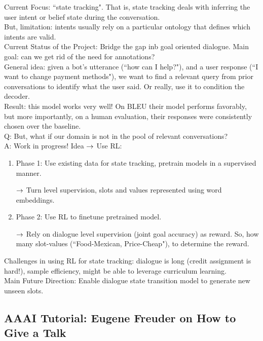 Current Focus: ``state tracking". That is, state tracking deals with inferring the user intent or belief state during the conversation. \\

But, limitation: intents usually rely on a particular ontology that defines which intents are valid. \\

Current Status of the Project: Bridge the gap inb goal oriented dialogue. Main goal: can we get rid of the need for annotations? \\

General idea: given a bot's utterance (``how can I help?"), and a user response (``I want to change payment methods"), we want to find a relevant query from prior conversations to identify what the user said. Or really, use it to condition the decoder. \\

Result: this model works very well! On BLEU their model performs favorably, but more importantly, on a human evaluation, their responses were consistently chosen over the baseline. \\

Q: But, what if our domain is not in the pool of relevant conversations? \\

A: Work in progress! Idea $\rightarrow$ Use RL:
\begin{enumerate}
    \item Phase 1: Use existing data for state tracking, pretrain models in a supervised manner.
    
    $\rightarrow$ Turn level supervision, slots and values represented using word embeddings.
    
    \item Phase 2: Use RL to finetune pretrained model.
    
    $\rightarrow$ Rely on dialogue level supervision (joint goal accuracy) as reward. So, how many slot-values (``Food-Mexican, Price-Cheap"), to determine the reward.
\end{enumerate}

Challenges in using RL for state tracking: dialogue is long (credit assignment is hard!), sample efficiency, might be able to leverage curriculum learning. \\

Main Future Direction: Enable dialogue state transition model to generate new unseen slots.


\spacerule
\subsection{AAAI Tutorial: Eugene Freuder on How to Give a Talk}


